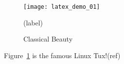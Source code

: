 \documentclass{article}
\begin{document}
\begin{figure}
  \centering
  \texttt{[image: latex\_demo\_01]}
  \caption{Classical Beauty}
  \label{fig:Beautiful} (label)
\end{figure}

Figure~\ref{fig:Beautiful} is the famous Linux Tux!(ref)
\end{document}
